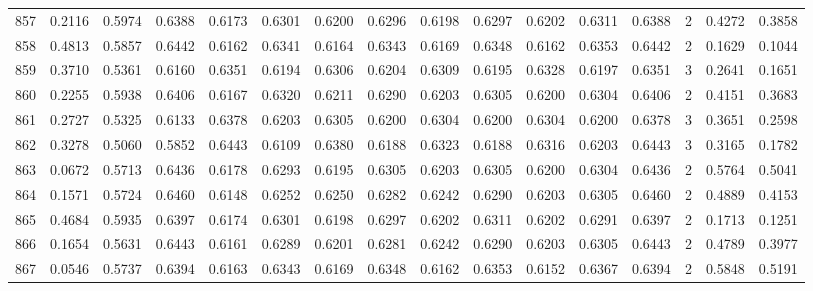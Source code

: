 \begin{tabular}{lrrrrrrrrrrrrrrr}
857 &      0.2116 &  0.5974 &  0.6388 &  0.6173 &  0.6301 &  0.6200 &  0.6296 &  0.6198 &  0.6297 &  0.6202 &   0.6311 &     0.6388 &      2 &                    0.4272 &                     0.3858 \\
858 &      0.4813 &  0.5857 &  0.6442 &  0.6162 &  0.6341 &  0.6164 &  0.6343 &  0.6169 &  0.6348 &  0.6162 &   0.6353 &     0.6442 &      2 &                    0.1629 &                     0.1044 \\
859 &      0.3710 &  0.5361 &  0.6160 &  0.6351 &  0.6194 &  0.6306 &  0.6204 &  0.6309 &  0.6195 &  0.6328 &   0.6197 &     0.6351 &      3 &                    0.2641 &                     0.1651 \\
860 &      0.2255 &  0.5938 &  0.6406 &  0.6167 &  0.6320 &  0.6211 &  0.6290 &  0.6203 &  0.6305 &  0.6200 &   0.6304 &     0.6406 &      2 &                    0.4151 &                     0.3683 \\
861 &      0.2727 &  0.5325 &  0.6133 &  0.6378 &  0.6203 &  0.6305 &  0.6200 &  0.6304 &  0.6200 &  0.6304 &   0.6200 &     0.6378 &      3 &                    0.3651 &                     0.2598 \\
862 &      0.3278 &  0.5060 &  0.5852 &  0.6443 &  0.6109 &  0.6380 &  0.6188 &  0.6323 &  0.6188 &  0.6316 &   0.6203 &     0.6443 &      3 &                    0.3165 &                     0.1782 \\
863 &      0.0672 &  0.5713 &  0.6436 &  0.6178 &  0.6293 &  0.6195 &  0.6305 &  0.6203 &  0.6305 &  0.6200 &   0.6304 &     0.6436 &      2 &                    0.5764 &                     0.5041 \\
864 &      0.1571 &  0.5724 &  0.6460 &  0.6148 &  0.6252 &  0.6250 &  0.6282 &  0.6242 &  0.6290 &  0.6203 &   0.6305 &     0.6460 &      2 &                    0.4889 &                     0.4153 \\
865 &      0.4684 &  0.5935 &  0.6397 &  0.6174 &  0.6301 &  0.6198 &  0.6297 &  0.6202 &  0.6311 &  0.6202 &   0.6291 &     0.6397 &      2 &                    0.1713 &                     0.1251 \\
866 &      0.1654 &  0.5631 &  0.6443 &  0.6161 &  0.6289 &  0.6201 &  0.6281 &  0.6242 &  0.6290 &  0.6203 &   0.6305 &     0.6443 &      2 &                    0.4789 &                     0.3977 \\
867 &      0.0546 &  0.5737 &  0.6394 &  0.6163 &  0.6343 &  0.6169 &  0.6348 &  0.6162 &  0.6353 &  0.6152 &   0.6367 &     0.6394 &      2 &                    0.5848 &                     0.5191 \\

\end{tabular}
